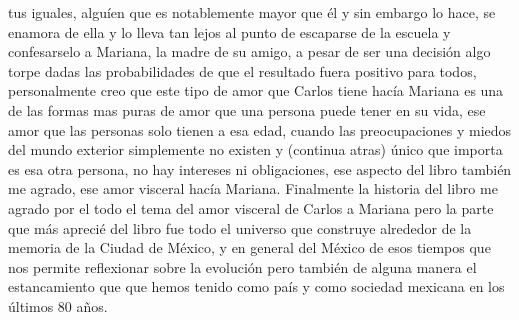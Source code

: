 \documentclass[12pt]{article}
\begin{document}
tus iguales, alguíen que es notablemente mayor que él y sin embargo lo hace, se enamora de ella y lo
lleva tan lejos al punto de escaparse de la escuela y confesarselo a Mariana, la madre de su amigo,
a pesar de ser una decisión algo torpe dadas las probabilidades de que el resultado fuera positivo
para todos, personalmente creo que este tipo de amor que Carlos tiene hacía Mariana es una de las
formas mas puras de amor que una persona puede tener en su vida, ese amor que las personas solo
tienen a esa edad, cuando las preocupaciones y miedos del mundo exterior simplemente no existen y
{\footnotesize (continua atras)}
\newpage
único que importa es esa otra persona, no hay intereses ni obligaciones, ese aspecto del libro
también me agrado, ese amor visceral hacía Mariana. Finalmente la historia del libro me agrado por
el todo el tema del amor visceral de Carlos a Mariana pero la parte que más aprecié del libro fue
todo el universo que construye alrededor de la memoria de la Ciudad de México, y en general del
México de esos tiempos que nos permite reflexionar sobre la evolución pero también de alguna manera
el estancamiento que que hemos tenido como país y como sociedad mexicana en los últimos 80 años.
\end{document}
